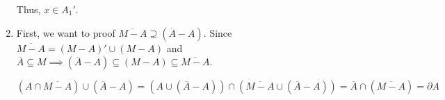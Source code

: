 \documentclass[12pt]{article}
\begin{document}
\begin{enumerate}
    Thus, $x \in A_1'$.
    \item First, we want to proof $\overline{M-A} \supseteq (\overline{A} - A)$.
    Since $\overline{M-A} = (M-A)' \cup (M-A)$ and $\overline{A} \subseteq M\implies (\overline{A} - A) \subseteq (M - A) \subseteq \overline{M-A}$.
    
    $(A \cap \overline{M-A}) \cup (\overline{A} - A) = (A\cup (\overline{A}-A)) \cap (\overline{M-A} \cup (\overline{A} - A)) = \overline{A} \cap (\overline{M-A}) = \partial A$ 
\end{enumerate}
\end{document}
